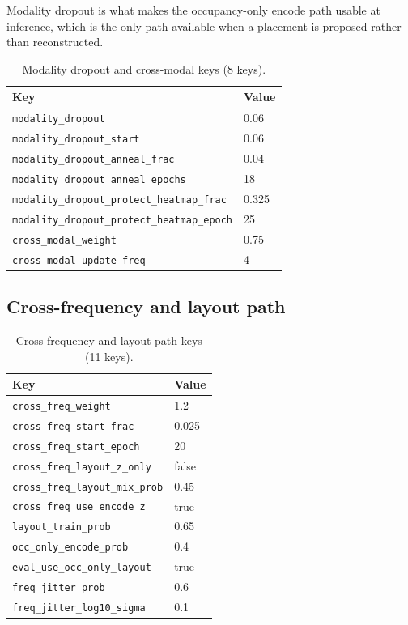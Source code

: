 Modality dropout is what makes the occupancy-only encode path usable at inference, which
is the only path available when a placement is proposed rather than reconstructed.

\begin{table}[htbp]
\centering
\caption{Modality dropout and cross-modal keys (8 keys).}
\label{tab:appb_moddrop}
\begin{tabular}{@{}ll@{}}
\hline
Key & Value \\
\hline
\texttt{modality\_dropout} & 0.06 \\
\texttt{modality\_dropout\_start} & 0.06 \\
\texttt{modality\_dropout\_anneal\_frac} & 0.04 \\
\texttt{modality\_dropout\_anneal\_epochs} & 18 \\
\texttt{modality\_dropout\_protect\_heatmap\_frac} & 0.325 \\
\texttt{modality\_dropout\_protect\_heatmap\_epoch} & 25 \\
\texttt{cross\_modal\_weight} & 0.75 \\
\texttt{cross\_modal\_update\_freq} & 4 \\
\hline
\end{tabular}
\end{table}

\subsection{Cross-frequency and layout path}
\label{subsec:appb_crossfreq}

\begin{table}[htbp]
\centering
\caption{Cross-frequency and layout-path keys (11 keys).}
\label{tab:appb_crossfreq}
\begin{tabular}{@{}ll@{}}
\hline
Key & Value \\
\hline
\texttt{cross\_freq\_weight} & 1.2 \\
\texttt{cross\_freq\_start\_frac} & 0.025 \\
\texttt{cross\_freq\_start\_epoch} & 20 \\
\texttt{cross\_freq\_layout\_z\_only} & false \\
\texttt{cross\_freq\_layout\_mix\_prob} & 0.45 \\
\texttt{cross\_freq\_use\_encode\_z} & true \\
\texttt{layout\_train\_prob} & 0.65 \\
\texttt{occ\_only\_encode\_prob} & 0.4 \\
\texttt{eval\_use\_occ\_only\_layout} & true \\
\texttt{freq\_jitter\_prob} & 0.6 \\
\texttt{freq\_jitter\_log10\_sigma} & 0.1 \\
\hline
\end{tabular}
\end{table}

